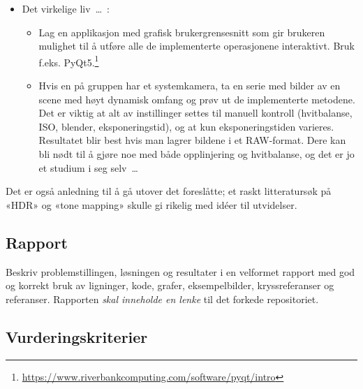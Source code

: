 \documentclass[11pt,a4paper]{article}
\begin{document}
\begin{itemize}[noitemsep]
\begin{itemize}
  \item Implementer det implisitte numeriske skjemaet~(\ref{eq:implisitt}) vha. glisne matriser («sparse matrices»)\footnote{\url{https://docs.scipy.org/doc/scipy/reference/sparse.html}} og benytt det for alle de implementerte anvendelsene.
  \item Undersøk nøyaktigheten av de implementerte løsningene vha. av metoden med konstruerte løsninger (jf. arbeidskrav 6). Se spesielt på forskjellen mellom de to implementasjonene av randverdier.
  \end{itemize}
\item Det virkelige liv~\dots~:
  \begin{itemize}
  \item Lag en applikasjon med grafisk brukergrensesnitt som gir brukeren mulighet til å utføre alle de implementerte operasjonene interaktivt. Bruk f.eks. PyQt5.\footnote{\url{https://www.riverbankcomputing.com/software/pyqt/intro}}
  \item Hvis en på gruppen har et systemkamera, ta en serie med bilder av en scene med høyt dynamisk omfang og prøv ut de implementerte metodene. Det er viktig at alt av instillinger settes til manuell kontroll (hvitbalanse, ISO, blender, eksponeringstid), og at kun eksponeringstiden varieres. Resultatet blir best hvis man lagrer bildene i et RAW-format. Dere kan bli nødt til å gjøre noe med både opplinjering og hvitbalanse, og det er jo et studium i seg selv~\dots
  \end{itemize}
\end{itemize}
Det er også anledning til å gå utover det foreslåtte; et raskt litteratursøk på «HDR» og «tone mapping» skulle gi rikelig med idéer til utvidelser.

\subsection{Rapport}

 Beskriv problemstillingen, løsningen og resultater i en velformet rapport med god og korrekt bruk av ligninger, kode, grafer, eksempelbilder, kryssreferanser og referanser.  Rapporten \emph{skal inneholde en lenke} til det forkede repositoriet.

 \subsection{Vurderingskriterier}
\end{document}
